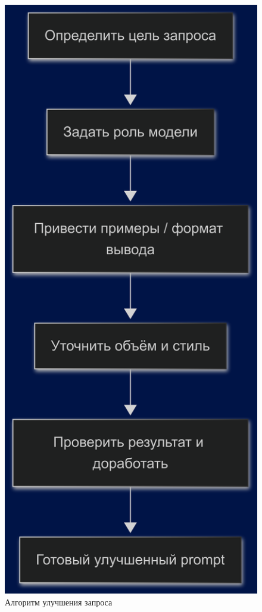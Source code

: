 \begin{figure}[htbp]
    \centering
    \includegraphics[height=0.7\textwidth]{picture/diploma_prompt_enchantement.png}
    \caption{Алгоритм улучшения запроса}
    \label{prompt_enchancement}
\end{figure}

